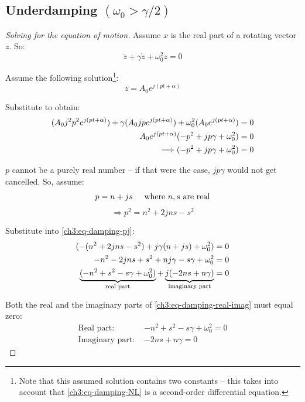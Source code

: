 \subsection{Underdamping $(\omega_0 > \gamma/2)$}
\begin{proof}[Solving for the equation of motion]
Assume $x$ is the real part of a rotating vector $z$. So:
\begin{equation*}
	\ddot{z} + \gamma \dot{z} + \omega_0^2 z = 0
\end{equation*}

Assume the following solution\footnote{Note that this assumed solution contains two constants -- this takes into account that \eqref{ch3:eq-damping-NL} is a second-order differential equation.}:
\begin{equation}
z=A_0 e^{j(pt+\alpha)} \label{ch3:eq-damping-assumed-z}
\end{equation}

Substitute to obtain:
\begin{align}
	(A_0 j^2 p^2 e^{j(pt+\alpha)}) + \gamma (A_0 jpe^{j(pt+\alpha)}) + \omega_0^2 (A_0 e^{j(pt+\alpha)}) &= 0 \notag \\
	A_0 e^{j(pt+\alpha)}(-p^2 + jp \gamma + \omega_0^2) &= 0 \notag \\
	\Longrightarrow (-p^2 + jp \gamma + \omega_0^2) &= 0 \label{ch3:eq-damping-pj}
\end{align}

$p$ cannot be a purely real number -- if that were the case, $jp\gamma$ would not get cancelled. So, assume:
\begin{equation} 
	p = n + js \hspace{0.5cm}\text{where } \text{$n,s$ are real} \label{ch3:eq-damping-p}
\end{equation}
\[ \Longrightarrow p^2 = n^2 + 2jns - s^2 \]

Substitute into \eqref{ch3:eq-damping-pj}:
\begin{align}
	 (-(n^2 + 2jns - s^2) + j \gamma (n+js) + \omega_0^2) &= 0 \notag \\
	-n^2 - 2jns + s^2 + nj \gamma - s \gamma + \omega_0^2 &= 0 \notag \\
	\underbrace{(-n^2 + s^2  - s \gamma + \omega_0^2)}_\text{real part} +  \underbrace{j(-2ns + n \gamma)}_\text{imaginary part} &= 0 \label{ch3:eq-damping-real-imag}
\end{align}

Both the real and the imaginary parts of \eqref{ch3:eq-damping-real-imag} must equal zero:
\begin{align*}
	\text{Real part: } & -n^2 + s^2  - s \gamma + \omega_0^2 = 0 \\
	\text{Imaginary part: } &-2ns + n \gamma = 0 
\end{align*}


\end{proof}

